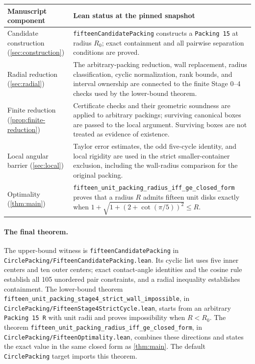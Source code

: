 \documentclass[11pt]{article}
\theoremstyle{definition}
\begin{document}
\begin{center}
\begin{tabular}{@{}>{\raggedright\arraybackslash}p{}>{\raggedright\arraybackslash}p{}@{}}
\toprule
Manuscript component & Lean status at the pinned snapshot\\
\midrule
Candidate construction (\cref{sec:construction}) &
\texttt{fifteenCandidatePacking} constructs a \texttt{Packing 15} at radius
$R_0$; exact containment and all pairwise separation conditions are proved.\\[5pt]
Radial reduction (\cref{sec:radial}) &
The arbitrary-packing reduction, wall replacement, radius classification,
cyclic normalization, rank bounds, and interval ownership are connected to
the finite Stage 0--4 checks used by the lower-bound theorem.\\[5pt]
Finite reduction (\cref{prop:finite-reduction}) &
Certificate checks and their geometric soundness are applied to arbitrary
packings; surviving canonical boxes are passed to the local argument.
Surviving boxes are not treated as evidence of existence.\\[5pt]
Local angular barrier (\cref{sec:local}) &
Taylor error estimates, the odd five-cycle identity, and local rigidity are
used in the strict smaller-container exclusion, including the wall-radius
comparison for the original packing.\\[5pt]
Optimality (\cref{thm:main}) &
\texttt{fifteen\_unit\_packing\_radius\_iff\_ge\_closed\_form} proves that a
radius $R$ admits fifteen unit disks exactly when
$1+\sqrt{1+(2+\cot(\pi/5))^2}\le R$.\\
\bottomrule
\end{tabular}
\end{center}

\paragraph{The final theorem.}
The upper-bound witness is
\nolinkurl{fifteenCandidatePacking} in
\nolinkurl{CirclePacking/FifteenCandidatePacking.lean}. Its cyclic list uses
five inner centers and ten outer centers; exact contact-angle identities and
the cosine rule establish all 105 unordered pair constraints, and a radial
inequality establishes containment. The lower-bound theorem
\nolinkurl{fifteen_unit_packing_stage4_strict_wall_impossible}, in
\nolinkurl{CirclePacking/FifteenStage4StrictCycle.lean}, starts from an
arbitrary \texttt{Packing 15 R} with unit radii and proves impossibility when
$R<R_0$. The theorem
\nolinkurl{fifteen\_unit\_packing\_radius\_iff\_ge\_closed\_form}, in
\nolinkurl{CirclePacking/FifteenOptimality.lean}, combines these directions
and states the exact value in the same closed form as \cref{thm:main}.
The default \texttt{CirclePacking} target imports this theorem.
\end{document}
